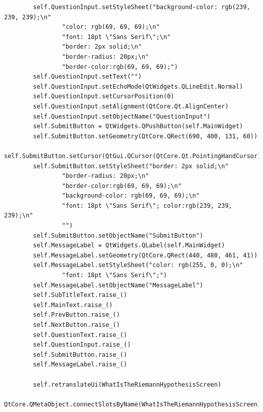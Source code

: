 \documentclass{article}
\begin{document}
\begin{lstlisting}
        self.QuestionInput.setStyleSheet("background-color: rgb(239, 239, 239);\n"
                "color: rgb(69, 69, 69);\n"
                "font: 18pt \"Sans Serif\";\n"
                "border: 2px solid;\n"
                "border-radius: 20px;\n"
                "border-color:rgb(69, 69, 69);")
        self.QuestionInput.setText("")
        self.QuestionInput.setEchoMode(QtWidgets.QLineEdit.Normal)
        self.QuestionInput.setCursorPosition(0)
        self.QuestionInput.setAlignment(QtCore.Qt.AlignCenter)
        self.QuestionInput.setObjectName("QuestionInput")
        self.SubmitButton = QtWidgets.QPushButton(self.MainWidget)
        self.SubmitButton.setGeometry(QtCore.QRect(690, 400, 131, 60))
        self.SubmitButton.setCursor(QtGui.QCursor(QtCore.Qt.PointingHandCursor))
        self.SubmitButton.setStyleSheet("border: 2px solid;\n"
                "border-radius: 20px;\n"
                "border-color:rgb(69, 69, 69);\n"
                "background-color: rgb(69, 69, 69);\n"
                "font: 18pt \"Sans Serif\"; color:rgb(239, 239, 239);\n"
                "")
        self.SubmitButton.setObjectName("SubmitButton")
        self.MessageLabel = QtWidgets.QLabel(self.MainWidget)
        self.MessageLabel.setGeometry(QtCore.QRect(440, 480, 461, 41))
        self.MessageLabel.setStyleSheet("color: rgb(255, 0, 0);\n"
                "font: 18pt \"Sans Serif\";")
        self.MessageLabel.setObjectName("MessageLabel")
        self.SubTitleText.raise_()
        self.MainText.raise_()
        self.PrevButton.raise_()
        self.NextButton.raise_()
        self.QuestionText.raise_()
        self.QuestionInput.raise_()
        self.SubmitButton.raise_()
        self.MessageLabel.raise_()

        self.retranslateUi(WhatIsTheRiemannHypothesisScreen)
        QtCore.QMetaObject.connectSlotsByName(WhatIsTheRiemannHypothesisScreen)


\end{lstlisting}
\end{document}
